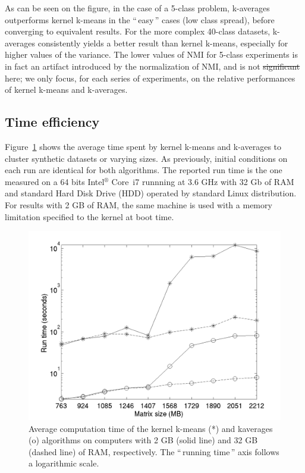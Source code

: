 \documentclass[natbib,smallextended]{svjour3}
\newcommand{\gl}[1]{``\,#1\,''} %
\providecommand{\DIFaddtex}[1]{{\protect\color{blue}\uwave{#1}}} %
\providecommand{\DIFdeltex}[1]{{\protect\color{red}\sout{#1}}}                      %
\providecommand{\DIFaddbegin}{} %
\providecommand{\DIFaddend}{} %
\providecommand{\DIFdelbegin}{} %
\providecommand{\DIFdelend}{} %
\providecommand{\DIFadd}[1]{\texorpdfstring{\DIFaddtex{#1}}{#1}} %
\providecommand{\DIFdel}[1]{\texorpdfstring{\DIFdeltex{#1}}{}} %
\begin{document}
As can be seen on the figure, in the case of a 5-class problem, k-averages outperforms kernel k-means in the \gl{easy} cases (low class spread), before converging to equivalent results. For the more complex 40-class datasets, k-averages consistently yields a better result than kernel k-means, especially for higher values of the variance. The lower values of NMI for 5-class experiments is in fact an artifact introduced by the normalization of NMI, and is not \DIFdelbegin \DIFdel{significant }\DIFdelend \DIFaddbegin \DIFadd{important }\DIFaddend here; we only focus, for each series of experiments, on the relative performances of kernel k-means and k-averages.

\subsection{Time efficiency}

Figure~\ref{fig:timing} shows the average time spent by kernel k-means and k-averages to cluster synthetic datasets or varying sizes. As previously, initial conditions on each run are identical for both algorithms. The reported run time is the one measured on a 64 bits Intel$^\circledR$ Core\texttrademark   \, i7 runnning at 3.6 GHz with 32 Gb of RAM and standard Hard Disk Drive (HDD)  operated by standard Linux distribution. For results with 2 GB of RAM, the same machine is used with a memory limitation specified to the kernel at boot time.

\begin{figure}
\center
\includegraphics[width= .7\textwidth]{figures/simpleSwap.png}
\caption{Average computation time of the kernel k-means (*) and kaverages (o) algorithms on computers with 2 GB (solid line) and 32 GB (dashed line) of RAM, respectively. The \gl{running time} axis follows a logarithmic scale.}
\label{fig:timing}
\end{figure}
\end{document}
